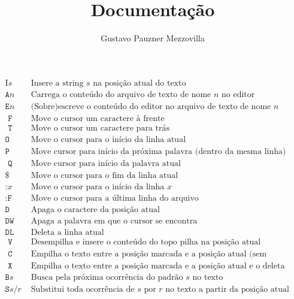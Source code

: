\documentclass[a4paper, 11pt]{article}
\title{Documentação}
\author{Gustavo Pauzner Mezzovilla}
\begin{document}
\maketitle

$$
\begin{array}{|c|l|}
\hline \text {I}s & \text { Insere a string } s \text { na posição atual do texto } \\
\texttt {A}n & \text { Carrega o conteúdo do arquivo de texto de nome } n \text { no editor } \\
\texttt{E}n & \text { (Sobre)escreve o conteúdo do editor no arquivo de texto de nome } n \\
\texttt{ F } & \text { Move o cursor um caractere à frente } \\
\texttt{ T } & \text { Move o cursor um caractere para trás } \\
\texttt{O} & \text { Move o cursor para o início da linha atual } \\
\texttt{P} & \text { Move cursor para início da próxima palavra (dentro da mesma linha) } \\
\texttt{ Q } & \text { Move cursor para início da palavra atual } \\
\$ & \text { Move o cursor para o fim da linha atual } \\
\texttt{:}x & \text { Move o cursor para o início da linha } x \\
\texttt{:F} & \text { Move o cursor para a última linha do arquivo } \\
\texttt{D} & \text { Apaga o caractere da posição atual } \\
\texttt{DW} & \text { Apaga a palavra em que o cursor se encontra } \\
\texttt{DL} & \text { Deleta a linha atual } \\
\texttt{ V } & \text { Desempilha e insere o conteúdo do topo pilha na posição atual } \\
\texttt{ C } & \text { Empilha o texto entre a posição marcada e a posição atual (sem modificá-lo) } \\
\texttt{ X } & \text { Empilha o texto entre a posição marcada e a posição atual e o deleta } \\
\texttt{B}s & \text { Busca pela próxima ocorrência do padrão } s \text { no texto } \\
\texttt{S}s/r & \text { Substitui toda ocorrência de } s \text { por } r \text { no texto a partir da posição atual } \\

\end{array}$$
\end{document}
